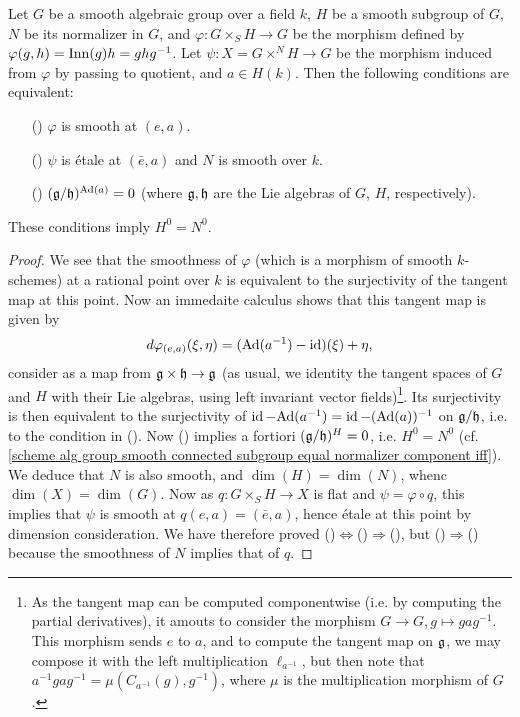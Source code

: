 \begin{corollary}\label{scheme alg group smooth twisted product morphism smooth iff}
Let $G$ be a smooth algebraic group over a field $k$, $H$ be a smooth subgroup of $G$, $N$ be its normalizer in $G$, and $\varphi:G\times_SH\to G$ be the morphism defined by $\varphi(g,h)=\mathrm{Inn}(g)h=ghg^{-1}$. Let $\psi:X=G\times^NH\to G$ be the morphism induced from $\varphi$ by passing to quotient, and $a\in H(k)$. Then the following conditions are equivalent:
\begin{enumerate}
    \item[(\rmnum{1})] $\varphi$ is smooth at $(e,a)$.
    \item[(\rmnum{2})] $\psi$ is \'etale at $(\bar{e},a)$ and $N$ is smooth over $k$.
    \item[(\rmnum{3})] $(\mathfrak{g}/\mathfrak{h})^{\mathrm{Ad}(a)}=0$ (where $\mathfrak{g},\mathfrak{h}$ are the Lie algebras of $G$, $H$, respectively).  
\end{enumerate}
These conditions imply $H^0=N^0$.
\end{corollary}
\begin{proof}
We see that the smoothness of $\varphi$ (which is a morphism of smooth $k$-schemes) at a rational point over $k$ is equivalent to the surjectivity of the tangent map at this point. Now an immedaite calculus shows that this tangent map is given by
\[d\varphi_{(e,a)}(\xi,\eta)=(\mathrm{Ad}(a^{-1})-\operatorname{id})(\xi)+\eta,\]
consider as a map from $\mathfrak{g}\times\mathfrak{h}\to\mathfrak{g}$ (as usual, we identity the tangent spaces of $G$ and $H$ with their Lie algebras, using left invariant vector fields)\footnote{As the tangent map can be computed componentwise (i.e. by computing the partial derivatives), it amouts to consider the morphism $G\to G,g\mapsto gag^{-1}$. This morphism sends $e$ to $a$, and to compute the tangent map on $\mathfrak{g}$, we may compose it with the left multiplication $\ell_{a^{-1}}$, but then note that $a^{-1}gag^{-1}=\mu(C_{a^{-1}}(g),g^{-1})$, where $\mu$ is the multiplication morphism of $G$.}. Its surjectivity is then equivalent to the surjectivity of $\operatorname{id}-\mathrm{Ad}(a^{-1})=\operatorname{id}-(\mathrm{Ad}(a))^{-1}$ on $\mathfrak{g}/\mathfrak{h}$, i.e. to the condition in (). Now () implies a fortiori $(\mathfrak{g}/\mathfrak{h})^H=0$, i.e. $H^0=N^0$ (cf. \cref{scheme alg group smooth connected subgroup equal normalizer component iff}). We deduce that $N$ is also smooth, and $\dim(H)=\dim(N)$, whenc $\dim(X)=\dim(G)$. Now as $q:G\times_SH\to X$ is flat and $\psi=\varphi\circ q$, this implies that $\psi$ is smooth at $q(e,a)=(\bar{e},a)$, hence \'etale at this point by dimension consideration. We have therefore proved ()$\Leftrightarrow$()$\Rightarrow$(), but ()$\Rightarrow$() because the smoothness of $N$ implies that of $q$.
\end{proof}


